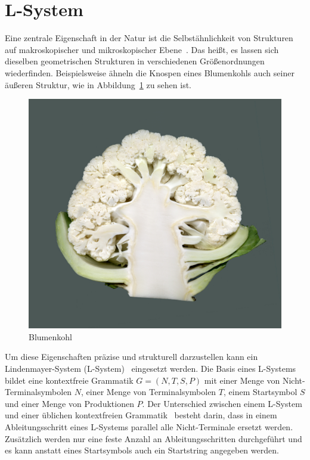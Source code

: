\section{L-System}\label{sec:L-System}
Eine zentrale Eigenschaft in der Natur ist die Selbstähnlichkeit von Strukturen auf makroskopischer und mikroskopischer Ebene~\cite{Shaker2016}.
Das heißt, es lassen sich dieselben geometrischen Strukturen in verschiedenen Größenordnungen wiederfinden.
Beispielsweise ähneln die Knospen eines Blumenkohls auch seiner äußeren Struktur, wie in Abbildung~\ref{fig:Blumenkohl} zu sehen ist.
\begin{figure}[ht]
    \centering
    \includegraphics[width=0.5\linewidth]{chapters/02_Grundlagen/L_System/Blumenkohl-1.jpg}
    \caption[Blumenkohl]{Blumenkohl\footnotemark}\label{fig:Blumenkohl}
\end{figure}
Um diese Eigenschaften präzise und strukturell darzustellen kann ein Lindenmayer-System (L-System)~\cite{lindenmayer1990} eingesetzt werden.
Die Basis eines L-Systems bildet eine kontextfreie Grammatik $G=(N,T,S,P)$ mit einer Menge von Nicht-Terminalsymbolen $N$, einer Menge von Terminalsymbolen $T$, einem Startsymbol $S$ und einer Menge von Produktionen $P$.
Der Unterschied zwischen einem L-System und einer üblichen kontextfreien Grammatik~\cite{Wegener2005} besteht darin, dass in einem Ableitungsschritt eines L-Systems parallel alle Nicht-Terminale ersetzt werden.
Zusätzlich werden nur eine feste Anzahl an Ableitungsschritten durchgeführt und es kann anstatt eines Startsymbols auch ein Startstring angegeben werden.

